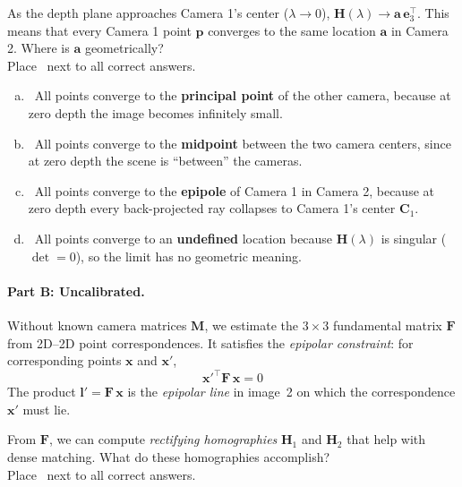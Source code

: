 \documentclass{csci1430}
\begin{document}
\pagebreak

\begin{subquestion}[points=4]
As the depth plane approaches Camera 1's center ($\lambda \to 0$), $\mathbf{H}(\lambda) \to \mathbf{a}\,\mathbf{e}_3^\top$. This means that every Camera 1 point $\mathbf{p}$ converges to the same location $\mathbf{a}$ in Camera 2.
Where is $\mathbf{a}$ geometrically? \\
Place \filled~next to all correct answers.
\end{subquestion}

\begin{answer}[height=10]
\begin{enumerate}[(a),leftmargin=12pt]
\item \cbox~All points converge to the \textbf{principal point} of the other camera, because at zero depth the image becomes infinitely small.
\item \cbox~All points converge to the \textbf{midpoint} between the two camera centers, since at zero depth the scene is ``between'' the cameras.
\item \cbox~All points converge to the \textbf{epipole} of Camera 1 in Camera 2, because at zero depth every back-projected ray collapses to Camera 1's center $\mathbf{C}_\text{1}$.
\item \cbox~All points converge to an \textbf{undefined} location because $\mathbf{H}(\lambda)$ is singular ($\det = 0$), so the limit has no geometric meaning.
\end{enumerate}
\end{answer}


\pagebreak

\paragraph{Part B: Uncalibrated.}
Without known camera matrices $\mathbf{M}$, we estimate the $3 \times 3$ fundamental matrix $\mathbf{F}$ from 2D--2D point correspondences. It satisfies the \emph{epipolar constraint}: for corresponding points $\mathbf{x}$ and $\mathbf{x}'$,
%
\begin{equation*}
{\mathbf{x}'}^\top \mathbf{F}\, \mathbf{x} = 0
\end{equation*}
%
The product $\mathbf{l}' = \mathbf{F}\, \mathbf{x}$ is the \emph{epipolar line} in image~2 on which the correspondence $\mathbf{x}'$ must lie.

\begin{subquestion}[points=2]
From $\mathbf{F}$, we can compute \emph{rectifying homographies} $\mathbf{H}_1$ and $\mathbf{H}_2$ that help with dense matching.
What do these homographies accomplish? \\
Place \filled~next to all correct answers.
\end{subquestion}
\end{document}
